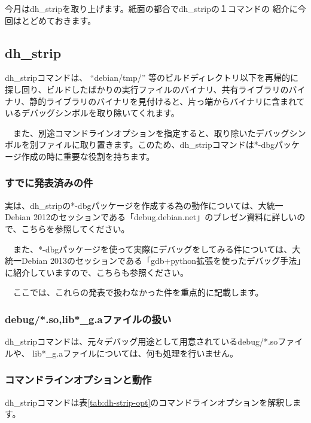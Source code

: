 \documentclass[mingoth,a4paper]{jsarticle}
\begin{document}
 今月はdh\_stripを取り上げます。紙面の都合でdh\_stripの１コマンドの
紹介に今回はとどめておきます。

\subsection{dh\_strip}

 dh\_stripコマンドは、 ``debian/tmp/'' 等のビルドディレクトリ以下を再帰的に
探し回り、ビルドしたばかりの実行ファイルのバイナリ、共有ライブラリのバイナリ、静的ライブラリのバイナリを見付けると、片っ端からバイナリに含まれているデバッグシンボルを取り除いてくれます。

　また、別途コマンドラインオプションを指定すると、取り除いたデバッグシンボルを別ファイルに取り置きます。このため、dh\_stripコマンドは*-dbgパッケージ作成の時に重要な役割を持ちます。

\subsubsection{すでに発表済みの件}

 実は、dh\_stripの*-dbgパッケージを作成する為の動作については、大統一Debian 2012のセッションである「debug.debian.net」\cite{debug-debian-net}のプレゼン資料に詳しいので、こちらを参照してください。

　また、*-dbgパッケージを使って実際にデバッグをしてみる件については、大統一Debian 2013のセッションである「gdb+python拡張を使ったデバッグ手法」\cite{gdb-python-debug2}に紹介していますので、こちらも参照ください。

　ここでは、これらの発表で扱わなかった件を重点的に記載します。

\subsubsection{debug/*.so,lib*\_g.aファイルの扱い}

 dh\_stripコマンドは、元々デバッグ用途として用意されているdebug/*.soファイルや、
lib*\_g.aファイルについては、何も処理を行いません。

\subsubsection{コマンドラインオプションと動作}

 dh\_stripコマンドは表\ref{tab:dh-strip-opt}のコマンドラインオプションを解釈します。
\end{document}
